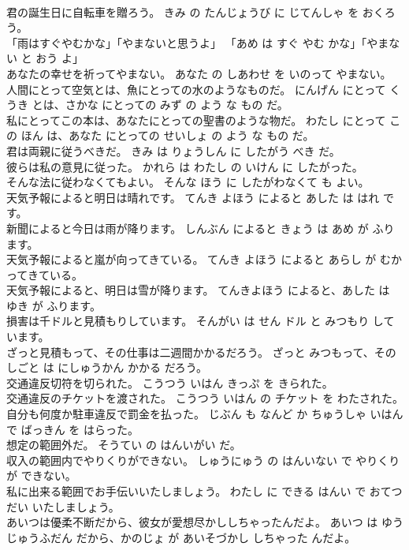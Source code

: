 \documentclass[8pt]{extreport}
\begin{document}
\begin{CJK}{UTF8}{min}
\\	君の誕生日に自転車を贈ろう。	きみ の たんじょうび に じてんしゃ を おくろう。	
\\	「雨はすぐやむかな」「やまないと思うよ」	「あめ は すぐ やむ かな」「やまない と おう よ」	
\\	あなたの幸せを祈ってやまない。	あなた の しあわせ を いのって やまない。	
\\	人間にとって空気とは、魚にとっての水のようなものだ。	にんげん にとって くうき とは、さかな にとっての みず の よう な もの だ。	
\\	私にとってこの本は、あなたにとっての聖書のような物だ。	わたし にとって この ほん は、あなた にとっての せいしょ の よう な もの だ。	
\\	君は両親に従うべきだ。	きみ は りょうしん に したがう べき だ。	
\\	彼らは私の意見に従った。	かれら は わたし の いけん に したがった。	
\\	そんな法に従わなくてもよい。	そんな ほう に したがわなくて も よい。	
\\	天気予報によると明日は晴れです。	てんき よほう によると あした は はれ です。	
\\	新聞によると今日は雨が降ります。	しんぶん によると きょう は あめ が ふります。	
\\	天気予報によると嵐が向ってきている。	てんき よほう によると あらし が むかってきている。	
\\	天気予報によると、明日は雪が降ります。	てんきよほう によると、あした は ゆき が ふります。	
\\	損害は千ドルと見積もりしています。	そんがい は せん ドル と みつもり しています。	
\\	ざっと見積もって、その仕事は二週間かかるだろう。	ざっと みつもって、その しごと は にしゅうかん かかる だろう。	
\\	交通違反切符を切られた。	こうつう いはん きっぷ を きられた。	
\\	交通違反のチケットを渡された。	こうつう いはん の チケット を わたされた。	
\\	自分も何度か駐車違反で罰金を払った。	じぶん も なんど か ちゅうしゃ いはん で ばっきん を はらった。	
\\	想定の範囲外だ。	そうてい の はんいがい だ。	
\\	収入の範囲内でやりくりができない。	しゅうにゅう の はんいない で やりくり が できない。	
\\	私に出来る範囲でお手伝いいたしましょう。	わたし に できる はんい で おてつだい いたしましょう。	
\\	あいつは優柔不断だから、彼女が愛想尽かししちゃったんだよ。	あいつ は ゆうじゅうふだん だから、かのじょ が あいそづかし しちゃった んだよ。	

\end{CJK}
\end{document}
